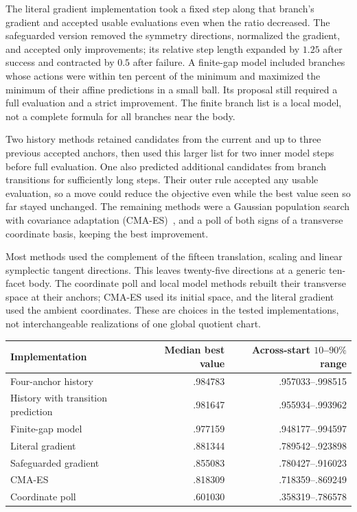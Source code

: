 The literal gradient implementation took a fixed step along that branch's
gradient and accepted usable evaluations even when the ratio decreased.
The safeguarded version removed the symmetry directions, normalized the
gradient, and accepted only improvements; its relative step length expanded
by $1.25$ after success and contracted by $0.5$ after failure. A finite-gap
model included branches whose actions were within ten percent of the
minimum and maximized the minimum of their affine predictions in a small
ball. Its proposal still required a full evaluation and a strict improvement.
The finite branch list is a local model, not a complete formula for all
branches near the body.

Two history methods retained candidates from the current and up to three
previous accepted anchors, then used this larger list for two inner model
steps before full evaluation. One also predicted additional candidates from
branch transitions for sufficiently long steps. Their outer rule accepted
any usable evaluation, so a move could reduce the objective even while the
best value seen so far stayed unchanged. The remaining methods were a
Gaussian population search with covariance adaptation (CMA-ES)~\cite{dsHansen2016}, and a poll
of both signs of a transverse coordinate basis, keeping the best improvement.

Most methods used the complement of the fifteen translation, scaling and
linear symplectic tangent directions. This leaves twenty-five directions
at a generic ten-facet body. The coordinate poll and local model methods
rebuilt their transverse space at their anchors; CMA-ES used its initial
space, and the literal gradient used the ambient coordinates. These are
choices in the tested implementations, not interchangeable realizations of
one global quotient chart.

\begin{center}
\begin{tabular}{lrr}
\hline
Implementation & Median best value & Across-start $10$--$90\%$ range\\
\hline
Four-anchor history & .984783 & .957033--.998515\\
History with transition prediction & .981647 & .955934--.993962\\
Finite-gap model & .977159 & .948177--.994597\\
Literal gradient & .881344 & .789542--.923898\\
Safeguarded gradient & .855083 & .780427--.916023\\
CMA-ES & .818309 & .718359--.869249\\
Coordinate poll & .601030 & .358319--.786578\\
\hline
\end{tabular}
\end{center}

